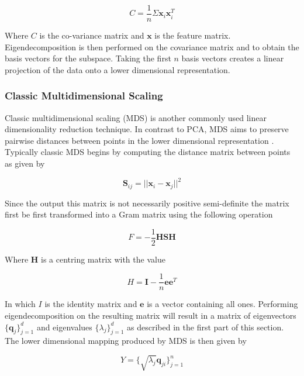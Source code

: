 \begin{equation}
	C = \frac{1}{n}\Sigma \mathbf{x}_i \mathbf{x}_i^T
\end{equation}

Where $C$ is the co-variance matrix and $\mathbf{x}$ is the feature matrix. Eigendecomposition is then performed on the covariance matrix and to obtain the basis vectors for the subspace. Taking the first $n$ basis vectors creates a linear projection of the data onto a lower dimensional representation.

\subsubsection{Classic Multidimensional Scaling}
Classic multidimensional scaling (MDS) is another commonly used linear dimensionality reduction technique. In contrast to PCA, MDS aims to preserve pairwise distances between points in the lower dimensional representation \cite{strange2014open}. Typically classic MDS begins by computing the distance matrix between points as given by

\begin{equation}
	\bm{S}_{ij} = || \bm{x}_i - \bm{x}_j ||^2
\end{equation}

Since the output this matrix is not necessarily positive semi-definite the matrix first be first transformed into a Gram matrix using the following operation \cite{strange2014open}

\begin{equation}
	F = - \frac{1}{2}\bm{HSH}
\end{equation}

Where $\bm{H}$ is a centring matrix with the value

\begin{equation}
	H = \bm{I} - \frac{1}{n}\bm{ee}^T
\end{equation}

In which $I$ is the identity matrix and $\bm{e}$ is a vector containing all ones. Performing eigendecomposition on the resulting matrix will result in a matrix of eigenvectors $\{\bm{q}_j\}_{j=1}^d$ and eigenvalues $\{\lambda_j\}_{j=1}^d$ as described in the first part of this section. The lower dimensional mapping produced by MDS is then given by

\begin{equation}
	Y = \{\sqrt{\lambda_j}\bm{q}_{ji}\}_{j=1}^n
\end{equation}

